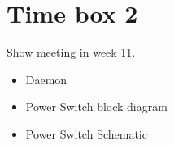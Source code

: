 \section{Time box 2}
Show meeting in week 11.
\begin{itemize}
	\item Daemon
	\item Power Switch block diagram
	\item Power Switch Schematic
\end{itemize}